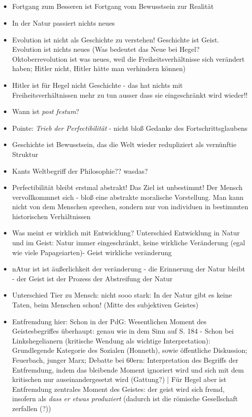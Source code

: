 \documentclass[emulatestandardclasses]{scrartcl}
\begin{document}
\subsection{}

\begin{itemize}
  \item Fortgang zum Besseren ist Fortgang vom Bewusstsein zur Realität
  \item In der Natur passiert nichts neues
  \item Evolution ist nicht als Geschichte zu verstehen! Geschichte ist Geist. Evolution ist nichts neues (Was bedeutet das Neue bei Hegel? Oktoberrevolution ist was neues, weil die Freiheitsverhältnisse sich verändert haben; Hitler nicht, Hitler hätte man verhindern können)
  \item Hitler ist für Hegel nicht Geschichte - das hat nichts mit Freiheitsverhältnissen mehr zu tun ausser dass sie eingeschränkt wird wieder!!
  \item Wann ist \emph{post festum}? 
  \item Pointe: \emph{Trieb der Perfectibilität} - nicht bloß Gedanke des Fortschrittsglaubens
  \item Geschichte ist Bewusstsein, das die Welt wieder redupliziert als vernünftie Struktur
  \item Kants Weltbegriff der Philosophie?? wasdas?
  \item Perfectibilität bleibt erstmal abstrakt! Das Ziel ist unbestimmt! Der Mensch vervollkommnet sich - bloß eine abstrakte moralische Vorstellung. Man kann nicht von dem Menschen sprechen, sondern nur von individuen in bestimmten historischen Verhältnissen
  \item Was meint er wirklich mit Entwicklung? Unterschied Entwicklung in Natur und im Geist: Natur immer eingeschränkt, keine wirkliche Veränderung (egal wie viele Papageiarten)- Geist wirkliche veränderung
  \item nAtur ist ist äußerlichkeit der veränderung - die Erinnerung der Natur bleibt - der Geist ist der Prozess der Abstreifung der Natur
  \item Unterschied Tier zu Mensch: nicht sooo stark: In der Natur gibt es keine Taten, beim Menschen schon! (Mitte des subjektiven Geistes)
  \item Entfremdung hier: Schon in der PdG: Wesentlichen Moment des Geistesbegriffes überhaupt: genau wie in dem Sinn auf S. 184 - Schon bei Linkshegelianern (kritische Wendung als wichtige Interpretation): Grundlegende Kategorie des Sozialen (Honneth), sowie öffentliche Diskussion; Feuerbach, junger Marx; Debatte bei 60ern: Interpretation des Begriffs der Entfremdung, indem das bleibende Moment ignoriert wird und sich mit dem kritischen nur auseinandergesetzt wird (Gattung?) | Für Hegel aber ist Entfremdung zentrales Moment des Geistes: der geist wird sich fremd, insofern als \emph{dass er etwas produziert} (dadurch ist die römische Gesellschaft zerfallen (?))

\end{itemize}
\end{document}
